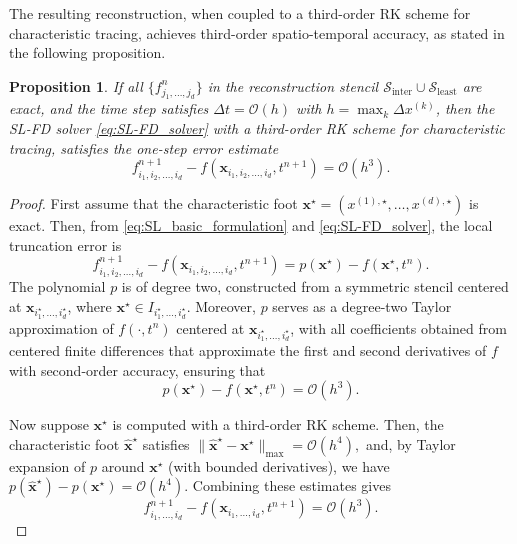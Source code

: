 \documentclass{article}
\theoremstyle{plain}
\newtheorem{proposition}[theorem]{Proposition}
\theoremstyle{definition}
\theoremstyle{remark}
\begin{document}
The resulting reconstruction, when coupled to a third-order RK scheme for characteristic tracing, achieves third-order spatio-temporal accuracy, as stated in the following proposition.
\begin{proposition}\label{prop:P2_analysis}
If all $\{f^n_{j_1,\ldots,j_d}\}$ in the reconstruction stencil $\mathcal{S}_{\mathrm{inter}} \cup \mathcal{S}_{\mathrm{least}}$ are exact, and the time step satisfies $\Delta t = \mathcal{O}(h)$ with $h = \max_k \Delta x^{(k)}$, then the SL-FD solver \eqref{eq:SL-FD_solver} with a third-order RK scheme for characteristic tracing, satisfies the one-step error estimate
\begin{equation*}
    f^{n+1}_{i_1,i_2,\ldots,i_d}-f(\bm{x}_{i_1,i_2,\ldots,i_d},t^{n+1})=\mathcal{O}(h^3).
\end{equation*}
\end{proposition}

\begin{proof}
    First assume that the characteristic foot $\bm{x}^\star = (x^{(1),\star},\ldots,x^{(d),\star})$ is exact. Then, from \eqref{eq:SL_basic_formulation} and \eqref{eq:SL-FD_solver}, the local truncation error is
    \begin{equation*}
        f^{n+1}_{i_1,i_2,\ldots,i_d} - f(\bm{x}_{i_1,i_2,\ldots,i_d},t^{n+1}) = p(\bm{x}^\star) - f(\bm{x}^\star,t^n).
    \end{equation*}
    The polynomial \( p \) is of degree two, constructed from a symmetric stencil centered at \( \bm{x}_{i_1^\star,\ldots,i_d^\star} \), where \( \bm{x}^\star \in I_{i_1^\star,\ldots,i_d^\star} \). Moreover, \( p \) serves as a degree-two Taylor approximation of \( f(\cdot, t^n) \) centered at \( \bm{x}_{i_1^\star,\ldots,i_d^\star} \), with all coefficients obtained from centered finite differences that approximate the first and second derivatives of \(f\) with second-order accuracy, ensuring that
    \begin{equation*}
        p(\bm{x}^\star) - f(\bm{x}^\star,t^n) = \mathcal{O}(h^3).
    \end{equation*}

    Now suppose \( \bm{x}^\star \) is computed with a third-order RK scheme. Then, the characteristic foot \( \hat{\bm{x}}^\star \) satisfies
    \(
        \|\hat{\bm{x}}^\star - \bm{x}^\star\|_{\max} = \mathcal{O}(h^4),
    \)
    and, by Taylor expansion of \( p \) around \( \bm{x}^\star \) (with bounded derivatives), we have
    \(
        p(\hat{\bm{x}}^\star) - p(\bm{x}^\star) = \mathcal{O}(h^4).
    \)
    Combining these estimates gives
    \[
        f^{n+1}_{i_1,\ldots,i_d} - f(\bm{x}_{i_1,\ldots,i_d}, t^{n+1}) 
        = \mathcal{O}(h^3).
    \]
\end{proof}
\end{document}
